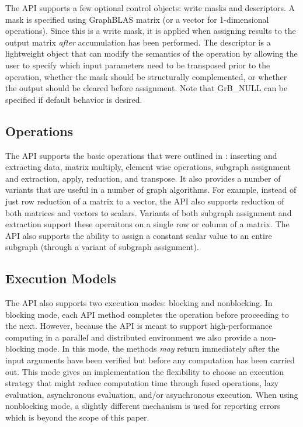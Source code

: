 The API supports a few optional control objects: write masks and descriptors.  A
mask is specified using GraphBLAS matrix (or a vector for 1-dimensional operations).
Since this is a write mask, it is applied when assigning results to the output matrix
{\em after} accumulation has been performed.
The descriptor is a lightweight object that can modify the semantics of the
operation by allowing the user to specify which input parameters need to be transposed
prior to the operation, whether the mask should be structurally complemented, or whether
the output should be cleared before assignment.
Note that {\sf GrB\_NULL} can be specified if default behavior is desired.

\subsection{Operations}

The API supports the basic operations that were outlined in \cite{mathgraphblas16}:
inserting and extracting data, matrix multiply, element wise operations, subgraph assignment
and extraction, apply, reduction, and transpose.  It also provides a number of
variants that are useful in a number of graph algorithms. For example, instead of
just row reduction of a matrix to a vector, the API also supports reduction of both
matrices and vectors to scalars.  Variants of both subgraph assignment and extraction
support these operaitons on a single row or column of a matrix.  The API also 
supports the ability to assign a constant
scalar value to an entire subgraph (through a variant of subgraph assignment). 

\subsection{Execution Models}

The API also supports two execution modes: blocking and nonblocking. In blocking mode,
each API method completes the operation before proceeding to the next.  However, 
because the API is meant to support high-performance computing in a parallel and
distributed environment we also provide a non-blocking mode.  In this mode, the methods
{\em may} return immediately after the input arguments have been verified but before
any computation has been carried out.  This mode gives an implementation the flexibility
to choose an execution strategy that might reduce computation time through fused
operations, lazy evaluation, asynchronous evaluation, and/or asynchronous execution.  When
using nonblocking mode, a slightly different mechanism is used for reporting errors which
is beyond the scope of this paper.
